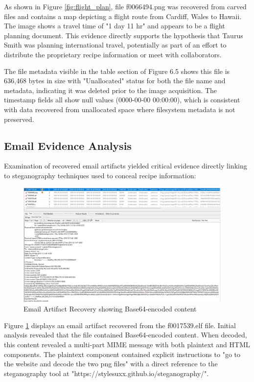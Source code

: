 As shown in Figure \ref{fig:flight_plan}, file f0066494.png was recovered from carved files and contains a map depicting a flight route from Cardiff, Wales to Hawaii. The image shows a travel time of "1 day 11 hr" and appears to be a flight planning document. This evidence directly supports the hypothesis that Taurus Smith was planning international travel, potentially as part of an effort to distribute the proprietary recipe information or meet with collaborators.

The file metadata visible in the table section of Figure 6.5 shows this file is 636,468 bytes in size with "Unallocated" status for both the file name and metadata, indicating it was deleted prior to the image acquisition. The timestamp fields all show null values (0000-00-00 00:00:00), which is consistent with data recovered from unallocated space where filesystem metadata is not preserved.

\subsection{Email Evidence Analysis}
Examination of recovered email artifacts yielded critical evidence directly linking to steganography techniques used to conceal recipe information:

\begin{figure}[htbp]
    \centering
    \includegraphics[width=0.95\textwidth]{images/Evidence Examination/Image6.png}
    \caption{Email Artifact Recovery showing Base64-encoded content}
    \label{fig:email_artifact}
\end{figure}

Figure \ref{fig:email_artifact} displays an email artifact recovered from the f0017539.elf file. Initial analysis revealed that the file contained Base64-encoded content. When decoded, this content revealed a multi-part MIME message with both plaintext and HTML components. The plaintext component contained explicit instructions to "go to the website and decode the two png files" with a direct reference to the steganography tool at "https://stylesuxx.github.io/steganography/".

